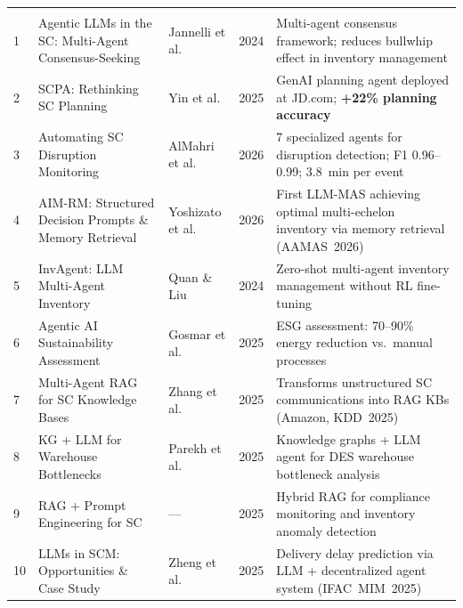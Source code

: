 \documentclass[11pt,a4paper]{article}
\begin{document}
\begin{longtable}{C{0.4cm} L{4.2cm} L{2.2cm} C{0.7cm} L{5.6cm}}
\toprule
\thead{\#} &  &  &  &  \\
\midrule
\endfirsthead
\toprule
\thead{\#} &  &  &  &  \\
\midrule
\endhead
\bottomrule
\endfoot

1 & Agentic LLMs in the SC: Multi-Agent Consensus-Seeking &
    Jannelli et al. & 2024 &
    Multi-agent consensus framework; reduces bullwhip effect in inventory management \\

2 & SCPA: Rethinking SC Planning &
    Yin et al. & 2025 &
    GenAI planning agent deployed at JD.com; \textbf{+22\% planning accuracy} \\

3 & Automating SC Disruption Monitoring &
    AlMahri et al. & 2026 &
    7 specialized agents for disruption detection; F1 0.96--0.99; 3.8~min per event \\

4 & AIM-RM: Structured Decision Prompts \& Memory Retrieval &
    Yoshizato et al. & 2026 &
    First LLM-MAS achieving optimal multi-echelon inventory via memory retrieval (AAMAS~2026) \\

5 & InvAgent: LLM Multi-Agent Inventory &
    Quan \& Liu & 2024 &
    Zero-shot multi-agent inventory management without RL fine-tuning \\

6 & Agentic AI Sustainability Assessment &
    Gosmar et al. & 2025 &
    ESG assessment: 70--90\% energy reduction vs.\ manual processes \\

7 & Multi-Agent RAG for SC Knowledge Bases &
    Zhang et al. & 2025 &
    Transforms unstructured SC communications into RAG KBs (Amazon, KDD~2025) \\

8 & KG + LLM for Warehouse Bottlenecks &
    Parekh et al. & 2025 &
    Knowledge graphs + LLM agent for DES warehouse bottleneck analysis \\

9 & RAG + Prompt Engineering for SC &
    --- & 2025 &
    Hybrid RAG for compliance monitoring and inventory anomaly detection \\

10 & LLMs in SCM: Opportunities \& Case Study &
    Zheng et al. & 2025 &
    Delivery delay prediction via LLM + decentralized agent system (IFAC~MIM~2025) \\


\end{longtable}
\end{document}
